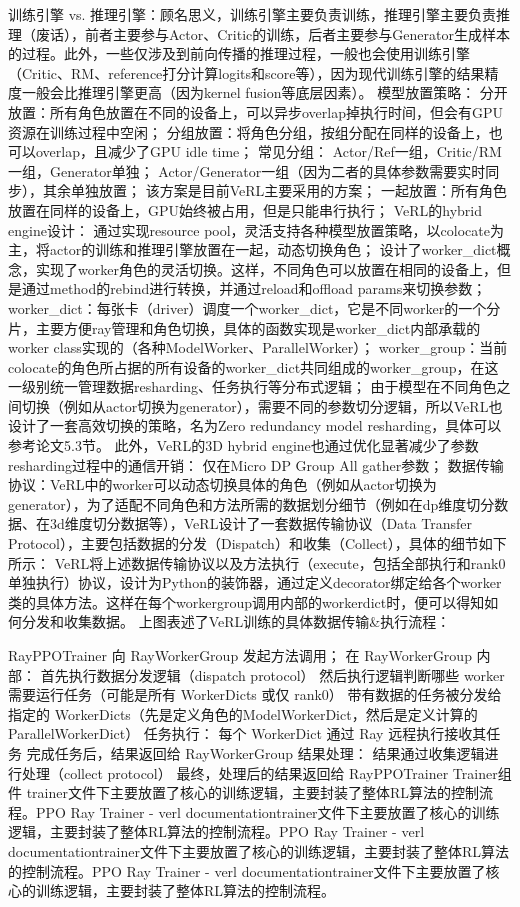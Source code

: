 \documentclass{pkuthesis}
\begin{document}
训练引擎 vs. 推理引擎：顾名思义，训练引擎主要负责训练，推理引擎主要负责推理（废话），前者主要参与Actor、Critic的训练，后者主要参与Generator生成样本的过程。此外，一些仅涉及到前向传播的推理过程，一般也会使用训练引擎（Critic、RM、reference打分计算logits和score等），因为现代训练引擎的结果精度一般会比推理引擎更高（因为kernel fusion等底层因素）。
模型放置策略：
分开放置：所有角色放置在不同的设备上，可以异步overlap掉执行时间，但会有GPU资源在训练过程中空闲；
分组放置：将角色分组，按组分配在同样的设备上，也可以overlap，且减少了GPU idle time；
常见分组：
Actor/Ref一组，Critic/RM一组，Generator单独；
Actor/Generator一组（因为二者的具体参数需要实时同步），其余单独放置；
该方案是目前VeRL主要采用的方案；
一起放置：所有角色放置在同样的设备上，GPU始终被占用，但是只能串行执行；
VeRL的hybrid engine设计：
通过实现resource pool，灵活支持各种模型放置策略，以colocate为主，将actor的训练和推理引擎放置在一起，动态切换角色；
设计了worker_dict概念，实现了worker角色的灵活切换。这样，不同角色可以放置在相同的设备上，但是通过method的rebind进行转换，并通过reload和offload params来切换参数；
worker_dict：每张卡（driver）调度一个worker_dict，它是不同worker的一个分片，主要方便ray管理和角色切换，具体的函数实现是worker_dict内部承载的worker class实现的（各种ModelWorker、ParallelWorker）；
worker_group：当前colocate的角色所占据的所有设备的worker_dict共同组成的worker_group，在这一级别统一管理数据resharding、任务执行等分布式逻辑；
由于模型在不同角色之间切换（例如从actor切换为generator），需要不同的参数切分逻辑，所以VeRL也设计了一套高效切换的策略，名为Zero redundancy model resharding，具体可以参考论文5.3节。
此外，VeRL的3D hybrid engine也通过优化显著减少了参数resharding过程中的通信开销：
仅在Micro DP Group All gather参数；
数据传输协议：VeRL中的worker可以动态切换具体的角色（例如从actor切换为generator），为了适配不同角色和方法所需的数据划分细节（例如在dp维度切分数据、在3d维度切分数据等），VeRL设计了一套数据传输协议（Data Transfer Protocol），主要包括数据的分发（Dispatch）和收集（Collect），具体的细节如下所示：
VeRL将上述数据传输协议以及方法执行（execute，包括全部执行和rank0单独执行）协议，设计为Python的装饰器，通过定义decorator绑定给各个worker类的具体方法。这样在每个workergroup调用内部的workerdict时，便可以得知如何分发和收集数据。
上图表述了VeRL训练的具体数据传输&执行流程：

RayPPOTrainer 向 RayWorkerGroup 发起方法调用；
在 RayWorkerGroup 内部：
首先执行数据分发逻辑（dispatch protocol）
然后执行逻辑判断哪些 worker 需要运行任务（可能是所有 WorkerDicts 或仅 rank0）
带有数据的任务被分发给指定的 WorkerDicts（先是定义角色的ModelWorkerDict，然后是定义计算的ParallelWorkerDict）
任务执行：
每个 WorkerDict 通过 Ray 远程执行接收其任务
完成任务后，结果返回给 RayWorkerGroup
结果处理：
结果通过收集逻辑进行处理（collect protocol）
最终，处理后的结果返回给 RayPPOTrainer
Trainer组件
trainer文件下主要放置了核心的训练逻辑，主要封装了整体RL算法的控制流程。PPO Ray Trainer - verl documentationtrainer文件下主要放置了核心的训练逻辑，主要封装了整体RL算法的控制流程。PPO Ray Trainer - verl documentationtrainer文件下主要放置了核心的训练逻辑，主要封装了整体RL算法的控制流程。PPO Ray Trainer - verl documentationtrainer文件下主要放置了核心的训练逻辑，主要封装了整体RL算法的控制流程。
\end{document}
